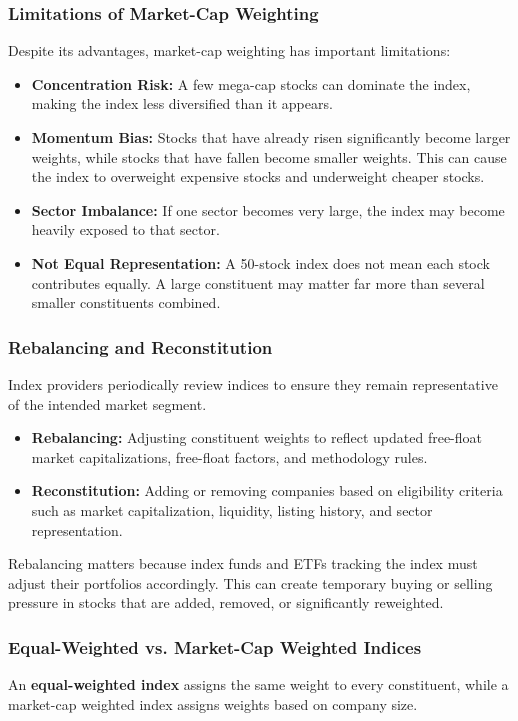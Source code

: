 \documentclass[12pt,openany]{book}
\begin{document}
\subsubsection{Limitations of Market-Cap Weighting}
Despite its advantages, market-cap weighting has important limitations:

\begin{itemize}[leftmargin=*]
    \item \textbf{Concentration Risk:} A few mega-cap stocks can dominate the index, making the index less diversified than it appears.
    \item \textbf{Momentum Bias:} Stocks that have already risen significantly become larger weights, while stocks that have fallen become smaller weights. This can cause the index to overweight expensive stocks and underweight cheaper stocks.
    \item \textbf{Sector Imbalance:} If one sector becomes very large, the index may become heavily exposed to that sector.
    \item \textbf{Not Equal Representation:} A 50-stock index does not mean each stock contributes equally. A large constituent may matter far more than several smaller constituents combined.
\end{itemize}

\subsubsection{Rebalancing and Reconstitution}
Index providers periodically review indices to ensure they remain representative of the intended market segment.

\begin{itemize}[leftmargin=*]
    \item \textbf{Rebalancing:} Adjusting constituent weights to reflect updated free-float market capitalizations, free-float factors, and methodology rules.
    \item \textbf{Reconstitution:} Adding or removing companies based on eligibility criteria such as market capitalization, liquidity, listing history, and sector representation.
\end{itemize}

Rebalancing matters because index funds and ETFs tracking the index must adjust their portfolios accordingly. This can create temporary buying or selling pressure in stocks that are added, removed, or significantly reweighted.

\subsubsection{Equal-Weighted vs. Market-Cap Weighted Indices}
An \textbf{equal-weighted index} assigns the same weight to every constituent, while a market-cap weighted index assigns weights based on company size.
\end{document}
